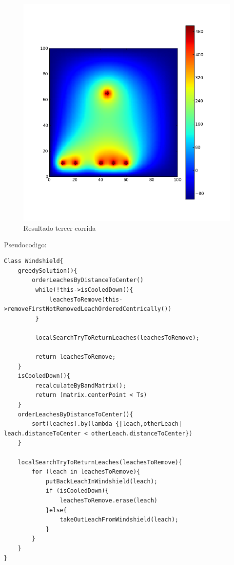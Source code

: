 \begin{figure}[htb]
\begin{center}
\includegraphics[scale=0.50]{imagenes/greedy_corrido.png} 
\caption{Resultado tercer corrida} 
\end{center}
\end{figure}

\newpage
Pseudocodigo:

\begin{verbatim}
Class Windshield{
    greedySolution(){
        orderLeachesByDistanceToCenter()
         while(!this->isCooledDown(){
             leachesToRemove(this->removeFirstNotRemovedLeachOrderedCentrically())
         }

         localSearchTryToReturnLeaches(leachesToRemove);

         return leachesToRemove;
    } 
    isCooledDown(){
         recalculateByBandMatrix();
         return (matrix.centerPoint < Ts)
    }
    orderLeachesByDistanceToCenter(){
        sort(leaches).by(lambda {|leach,otherLeach| leach.distanceToCenter < otherLeach.distanceToCenter})
    }

    localSearchTryToReturnLeaches(leachesToRemove){
        for (leach in leachesToRemove){
            putBackLeachInWindshield(leach);
            if (isCooledDown){
                leachesToRemove.erase(leach)
            }else{
                takeOutLeachFromWindshield(leach);
            }
        }
    }
}
\end{verbatim}



